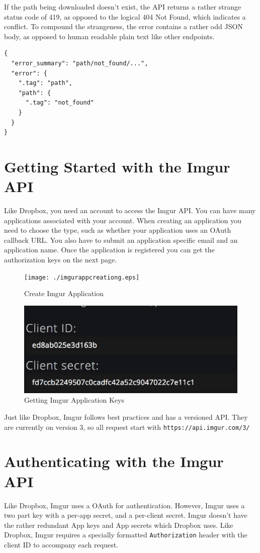 \documentclass[12pt]{article}
\begin{document}
If the path being downloaded doesn't exist, the API returns a rather strange status code of 419, as opposed to the logical 404 Not Found,  which indicates a conflict. To compound the strangeness, the error contains a rather odd JSON body, as opposed to human readable plain text like other endpoints.

\begin{verbatim}
{
  "error_summary": "path/not_found/...",
  "error": {
    ".tag": "path",
    "path": {
      ".tag": "not_found"
    }
  }
}
\end{verbatim}

\section{Getting Started with the Imgur API}
Like Dropbox, you need an account to access the Imgur API. You can have many applications associated with your account. When creating an application you need to choose the type, such as whether your application uses an OAuth callback URL. You also have to submit an application specific email and an application name. Once the application is registered you can get the authorization keys on the next page.

\begin{figure}[!ht]
\centering
\texttt{[image: ./imgurappcreationg.eps]}
\caption{Create Imgur Application}
\end{figure}


\begin{figure}[!ht]
\centering
\includegraphics[scale=0.5]{./imgurappkeys.eps}
\caption{Getting Imgur Application Keys}
\end{figure}

Just like Dropbox, Imgur follows best practices and has a versioned API. They are currently on version 3, so all request start with \texttt{https://api.imgur.com/3/}

\section{Authenticating with the Imgur API}
Like Dropbox, Imgur uses a OAuth for authentication. However, Imgur uses a two part key with a per-app secret, and a per-client secret. Imgur doesn't have the rather redundant App keys and App secrets which Dropbox uses. Like Dropbox, Imgur requires a specially formatted \texttt{Authorization} header with the client ID to accompany each request.
\end{document}
